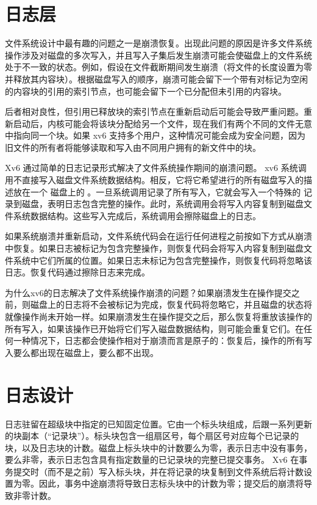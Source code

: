     \section{日志层  }     

文件系统设计中最有趣的问题之一是崩溃恢复。出现此问题的原因是许多文件系统操作涉及对磁盘的多次写入，并且写入子集后发生崩溃可能会使磁盘上的文件系统处于不一致的状态。例如，假设在文件截断期间发生崩溃（将文件的长度设置为零并释放其内容块）。根据磁盘写入的顺序，崩溃可能会留下一个带有对标记为空闲的内容块的引用的索引节点，也可能会留下一个已分配但未引用的内容块。  

后者相对良性，但引用已释放块的索引节点在重新启动后可能会导致严重问题。重新启动后，内核可能会将该块分配给另一个文件，现在我们有两个不同的文件无意中指向同一个块。如果 xv6 支持多个用户，这种情况可能会成为安全问题，因为旧文件的所有者将能够读取和写入由不同用户拥有的新文件中的块。  

Xv6 通过简单的日志记录形式解决了文件系统操作期间的崩溃问题。 xv6 系统调用不直接写入磁盘文件系统数据结构。相反，它将它希望进行的所有磁盘写入的描述放在一个
 磁盘上的       。一旦系统调用记录了所有写入，它就会写入一个特殊的
        记录到磁盘，表明日志包含完整的操作。此时，系统调用会将写入内容复制到磁盘文件系统数据结构。这些写入完成后，系统调用会擦除磁盘上的日志。  

如果系统崩溃并重新启动，文件系统代码会在运行任何进程之前按如下方式从崩溃中恢复。如果日志被标记为包含完整操作，则恢复代码会将写入内容复制到磁盘文件系统中它们所属的位置。如果日志未标记为包含完整操作，则恢复代码将忽略该日志。恢复代码通过擦除日志来完成。  

为什么xv6的日志解决了文件系统操作崩溃的问题？如果崩溃发生在操作提交之前，则磁盘上的日志将不会被标记为完成，恢复代码将忽略它，并且磁盘的状态将就像操作尚未开始一样。如果崩溃发生在操作提交之后，那么恢复将重放该操作的所有写入，如果该操作已开始将它们写入磁盘数据结构，则可能会重复它们。在任何一种情况下，日志都会使操作相对于崩溃而言是原子的：恢复后，操作的所有写入要么都出现在磁盘上，要么都不出现。
    \section{日志设计  }     

日志驻留在超级块中指定的已知固定位置。它由一个标头块组成，后跟一系列更新的块副本（“记录块”）。标头块包含一组扇区号，每个扇区号对应每个已记录的块，以及日志块的计数。磁盘上标头块中的计数要么为零，表示日志中没有事务，要么非零，表示日志包含具有指定数量的已记录块的完整已提交事务。 Xv6 在事务提交时（而不是之前）写入标头块，并在将记录的块复制到文件系统后将计数设置为零。因此，事务中途崩溃将导致日志标头块中的计数为零；提交后的崩溃将导致非零计数。  

